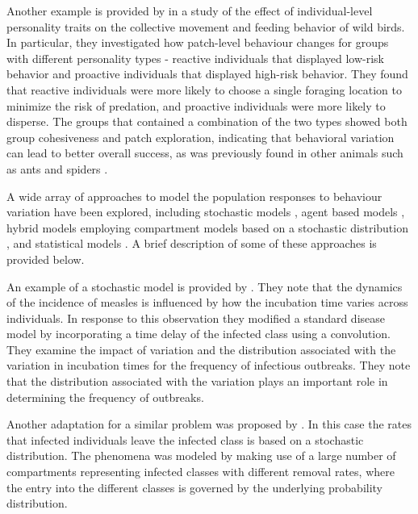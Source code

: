 \documentclass[review,authoryear]{elsarticle}
\begin{document}

Another example is provided by \cite{doi:10.1098/rspb.2014.1016} in a study of the effect of individual-level personality traits on the collective movement and feeding behavior of wild birds. In particular, they investigated how patch-level behaviour changes for groups with different personality types - reactive individuals that displayed low-risk behavior and proactive individuals that displayed high-risk behavior. They found that  reactive individuals were more likely to choose a single foraging location to minimize the risk of predation, and proactive individuals were more likely to disperse. The groups that contained a combination of the two types showed both group cohesiveness and patch exploration, indicating that behavioral variation can lead to better overall success, as was previously found in other animals such as ants and spiders \citep{ doi:10.1086/687235,modlmeier2011productivity,modlmeier2012diverse}.

A wide array of approaches to model the population responses to behaviour variation have been explored, including stochastic
models \citep{Keeling65}, agent based models \citep{doi:10.1086/687235},
hybrid models employing compartment models based on a stochastic
distribution \citep{doi:10.1098/rspb.2001.1599}, and statistical
models \citep{SuperspreadingLloyd}. A brief description of some of these
approaches is provided below.

An example of a stochastic model is provided by \cite{Keeling65}. They note that the dynamics of the incidence
of measles is influenced by how the incubation time varies across
individuals. In response to this observation they modified a standard
disease model by incorporating a time delay of the infected class using a convolution. They examine the impact of variation and the distribution associated with the variation in incubation times for the frequency of infectious outbreaks. They note that the distribution associated with the variation plays an important role in determining the frequency of outbreaks.


Another adaptation for a similar problem was proposed by \cite{doi:10.1098/rspb.2001.1599}. In this case the rates that
infected individuals leave the infected class is based on a stochastic
distribution. The phenomena was modeled by making use of a large
number of compartments representing infected classes with different removal rates, where the entry into the different classes is
governed by the underlying probability distribution.
\end{document}
